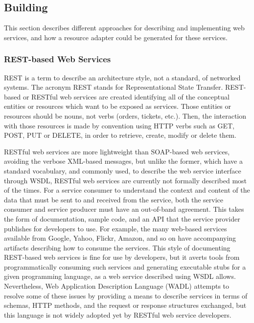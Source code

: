 \documentclass{fast_latex}
\begin{document}
\subsection{Building} %
\label{sub:building}

This section describes different approaches for describing and implementing web services, and how a resource adapter could be generated for these services.

\subsubsection{REST-based Web Services} %
\label{ssub:rest_based_web_services}

REST \cite{Fielding2000} is a term to describe an architecture style, not a standard, of networked systems. The acronym REST stands for Representational State Transfer. REST-based or RESTful web services are created identifying all of the conceptual entities or resources which want to be exposed as services. Those entities or resources should be nouns, not verbs (orders, tickets, etc.). Then, the interaction with those resources is made by convention using HTTP verbs such as GET, POST, PUT or DELETE, in order to retrieve, create, modify or delete them.

RESTful web services are more lightweight than SOAP-based web services, avoiding the verbose XML-based messages, but unlike the former, which have a standard vocabulary, and commonly used, to describe the web service interface through WSDL, RESTful web services are currently not formally described most of the times. For a service consumer to understand the context and content of the data that must be sent to and received from the service, both the service consumer and service producer must have an out-of-band agreement. This takes the form of documentation, sample code, and an API that the service provider publishes for developers to use. For example, the many web-based services available from Google, Yahoo, Flickr, Amazon, and so on have accompanying artifacts describing how to consume the services. This style of documenting REST-based web services is fine for use by developers, but it averts tools from programmatically consuming such services and generating executable stubs for a given programming language, as a web service described using WSDL allows. Nevertheless, Web Application Description Language (WADL) attempts to resolve some of these issues by providing a means to describe services in terms of schemas, HTTP methods, and the request or response structures exchanged, but this language is not widely adopted yet by RESTful web service developers.
\end{document}
